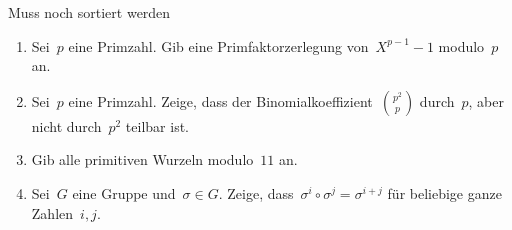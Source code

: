 \documentclass{algblatt}
\begin{document}
\begin{aufgabe}{Muss noch sortiert werden}
\begin{enumerate}
\item Sei~$p$ eine Primzahl. Gib eine Primfaktorzerlegung von~$X^{p-1}-1$
modulo~$p$ an.
\item Sei~$p$ eine Primzahl. Zeige, dass der
Binomialkoeffizient~$\binom{p^2}{p}$ durch~$p$, aber nicht durch~$p^2$ teilbar
ist.
\item Gib alle primitiven Wurzeln modulo~$11$ an.
\item Sei~$G$ eine Gruppe und~$\sigma \in G$. Zeige, dass~$\sigma^i \circ
\sigma^j = \sigma^{i + j}$ für beliebige ganze Zahlen~$i,j$.
\end{enumerate}
\end{aufgabe}
\end{document}

